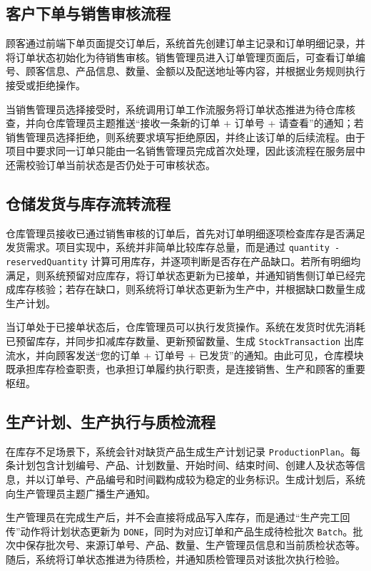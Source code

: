 \subsection{客户下单与销售审核流程}

顾客通过前端下单页面提交订单后，系统首先创建订单主记录和订单明细记录，并将订单状态初始化为待销售审核。销售管理员进入订单管理页面后，可查看订单编号、顾客信息、产品信息、数量、金额以及配送地址等内容，并根据业务规则执行接受或拒绝操作。

当销售管理员选择接受时，系统调用订单工作流服务将订单状态推进为待仓库核查，并向仓库管理员主题推送“接收一条新的订单 + 订单号 + 请查看”的通知；若销售管理员选择拒绝，则系统要求填写拒绝原因，并终止该订单的后续流程。由于项目中要求同一订单只能由一名销售管理员完成首次处理，因此该流程在服务层中还需校验订单当前状态是否仍处于可审核状态。

\subsection{仓储发货与库存流转流程}

仓库管理员接收已通过销售审核的订单后，首先对订单明细逐项检查库存是否满足发货需求。项目实现中，系统并非简单比较库存总量，而是通过 \texttt{quantity - reservedQuantity} 计算可用库存，并逐项判断是否存在产品缺口。若所有明细均满足，则系统预留对应库存，将订单状态更新为已接单，并通知销售侧订单已经完成库存核验；若存在缺口，则系统将订单状态更新为生产中，并根据缺口数量生成生产计划。

当订单处于已接单状态后，仓库管理员可以执行发货操作。系统在发货时优先消耗已预留库存，并同步扣减库存数量、更新预留数量、生成 \texttt{StockTransaction} 出库流水，并向顾客发送“您的订单 + 订单号 + 已发货”的通知。由此可见，仓库模块既承担库存检查职责，也承担订单履约执行职责，是连接销售、生产和顾客的重要枢纽。

\subsection{生产计划、生产执行与质检流程}

在库存不足场景下，系统会针对缺货产品生成生产计划记录 \texttt{ProductionPlan}。每条计划包含计划编号、产品、计划数量、开始时间、结束时间、创建人及状态等信息，并以订单号、产品编号和时间戳构成较为稳定的业务标识。生成计划后，系统向生产管理员主题广播生产通知。

生产管理员在完成生产后，并不会直接将成品写入库存，而是通过“生产完工回传”动作将计划状态更新为 \texttt{DONE}，同时为对应订单和产品生成待检批次 \texttt{Batch}。批次中保存批次号、来源订单号、产品、数量、生产管理员信息和当前质检状态等。随后，系统将订单状态推进为待质检，并通知质检管理员对该批次执行检验。

